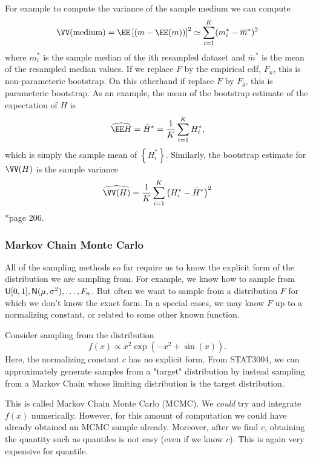 For example to compute the variance of the sample medium we can compute
\begin{equation*}
    \VV (\text{medium}) = \EE \left[ (m - \EE(m)) \right]^2 \simeq \sum_{i=1}^{K} (m_i^{\ast} - \overline{m}^{\ast})^2
\end{equation*}
where $m_i^{\ast}$ is the sample median of the ith resampled dataset and $\overline{m}^{\ast}$ is the mean of the resampled median values. If we replace $F$ by the empirical cdf, $F_n$, this is non-parameteric bootstrap. On this otherhand if replace $F$ by $F_{\hat{\theta}}$, this is parameteric bootstrap. As an example, the mean of the bootstrap estimate of the expectation of $H$ is
\[
    \widehat{\EE H} = \bar{H}^{\ast} = \frac{1}{K} \sum_{i=1}^{K} H_i^{\ast},
\]
which is simply the sample mean of $\left\{ H_i^{\ast} \right\}$. Similarly, the bootstrap estimate for $\VV (H)$ is the sample variance
\[
    \widehat{\VV (H)} = \frac{1}{K} \sum_{i=1}^{K} \left( H_i^{\ast} - \bar{H}^{\ast} \right)^2
\]
\cite{KroeseDirkP2013SMaC}*{page 206}.

\subsubsection*{Markov Chain Monte Carlo}

All of the sampling methods so far require us to know the explicit form of the distribution we are sampling from. For example, we know how to sample from ${\sf U} [0,1], {\sf N} (\mu , \sigma^2), \ldots , F_n$. But often we want to sample from a distribution $F$ for which we don't know the exact form. In a special cases, we may know $F$ up to a normalizing constant, or related to some other known function.

\begin{exam} \label{exam: mcmc_intro}
    Consider sampling from the distribution
    \begin{equation*}
        f (x) \propto x^2 \exp \left( -x^2 + \sin (x) \right).
    \end{equation*}
    Here, the normalizing constant $c$ has no explicit form. From STAT3004, we can approximately generate samples from a "target" distribution by instead sampling from a Markov Chain whose limiting distribution is the target distribution.
\end{exam}

This is called Markov Chain Monte Carlo (MCMC). We {\it could} try and integrate $f(x)$ numerically. However, for this amount of computation we could have already obtained an MCMC sample already. Moreover, after we find $c$, obtaining the quantity such as quantiles is not easy (even if we know $c$). This is again very expensive for quantile.

